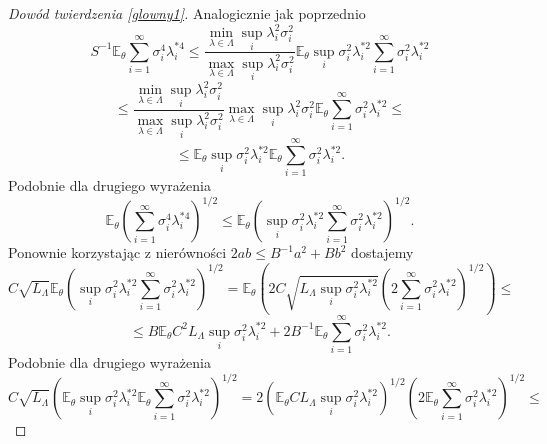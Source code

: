 \documentclass{mwart}
\begin{document}
\begin{proof}[Dowód twierdzenia \ref{glowny1}]
Analogicznie jak poprzednio
\begin{displaymath}
S^{-1}\mathbb{E}_{\theta}\sum_{i=1}^{\infty}\sigma_i^4\lambda_i^{*4}\leq \frac{\min_{\lambda\in \Lambda}\sup_i \lambda_i^2\sigma_i^2}{\max_{\lambda\in \Lambda}\sup_i \lambda_i^2\sigma_i^2}\mathbb{E}_{\theta}\sup_i\sigma_i^2\lambda_i^{*2}\sum_{i=1}^{\infty}\sigma_i^2\lambda_i^{*2}
\end{displaymath}
\begin{displaymath}
\leq \frac{\min_{\lambda\in \Lambda}\sup_i \lambda_i^2\sigma_i^2}{\max_{\lambda\in \Lambda}\sup_i \lambda_i^2\sigma_i^2}\max_{\lambda\in \Lambda}\sup_i \lambda_i^2\sigma_i^2\mathbb{E}_{\theta}\sum_{i=1}^{\infty}\sigma_i^2\lambda_i^{*2}\leq
\end{displaymath}
\begin{displaymath}
\leq \mathbb{E}_{\theta}\sup_i\sigma_i^2\lambda_i^{*2}\mathbb{E}_{\theta}\sum_{i=1}^{\infty}\sigma_i^2\lambda_i^{*2}.
\end{displaymath}
Podobnie dla drugiego wyrażenia
\begin{displaymath}
\mathbb{E}_{\theta}\left(\sum_{i=1}^{\infty}\sigma_i^4\lambda_i^{*4}\right)^{1/2}\leq \mathbb{E}_{\theta}\left(\sup_i\sigma_i^2\lambda_i^{*2}\sum_{i=1}^{\infty}\sigma_i^2\lambda_i^{*2}\right)^{1/2}.
\end{displaymath}
Ponownie korzystając z nierówności $2ab\leq B^{-1}a^2+Bb^2$ dostajemy
\begin{displaymath}
C\sqrt{L_{\Lambda}}\mathbb{E}_{\theta}\left(\sup_i\sigma_i^2\lambda_i^{*2}\sum_{i=1}^{\infty}\sigma_i^2\lambda_i^{*2}\right)^{1/2}=\mathbb{E}_{\theta}\left(2C\sqrt{L_{\Lambda}\sup_i\sigma_i^2\lambda_i^{*2}}\left(2\sum_{i=1}^{\infty}\sigma_i^2\lambda_i^{*2}\right)^{1/2}\right)\leq
\end{displaymath}
\begin{displaymath}
\leq B\mathbb{E}_{\theta}C^2L_{\Lambda}\sup_i\sigma_i^2\lambda_i^{*2}+2B^{-1}\mathbb{E}_{\theta}\sum_{i=1}^{\infty}\sigma_i^2\lambda_i^{*2}.
\end{displaymath}
Podobnie dla drugiego wyrażenia
\begin{displaymath}
C\sqrt{L_{\Lambda}}\left(\mathbb{E}_{\theta}\sup_i\sigma_i^2\lambda_i^{*2}\mathbb{E}_{\theta}\sum_{i=1}^{\infty}\sigma_i^2\lambda_i^{*2}\right)^{1/2}=2\left(\mathbb{E}_{\theta}CL_{\Lambda}\sup_i\sigma_i^2\lambda_i^{*2}\right)^{1/2}\left(2\mathbb{E}_{\theta}\sum_{i=1}^{\infty}\sigma_i^2\lambda_i^{*2}\right)^{1/2}\leq
\end{displaymath}
\begin{displaymath}

\end{displaymath}
\end{proof}
\end{document}
